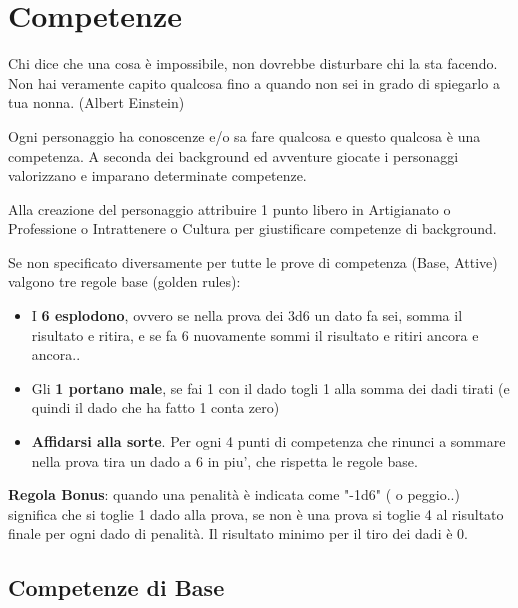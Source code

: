 \documentclass[a4paper,11pt,twoside,openany]{book}
\begin{document}

\pagebreak

\section{Competenze}

\label{competenze}
\begin{tcolorbox}[enhanced,arc=5pt,boxrule=0.3pt]{
Chi dice che una cosa è impossibile, non dovrebbe disturbare chi la sta facendo.\\
Non hai veramente capito qualcosa fino a quando non sei in grado di spiegarlo a tua nonna. (Albert Einstein)}\end{tcolorbox}\medskip


Ogni personaggio ha conoscenze e/o sa fare qualcosa e questo qualcosa è una competenza. A seconda dei background ed avventure giocate i personaggi valorizzano e imparano determinate competenze.

Alla creazione del personaggio attribuire 1 punto libero in Artigianato o Professione o Intrattenere o Cultura per giustificare competenze di background.

Se non specificato diversamente per tutte le prove di competenza (Base, Attive) valgono tre regole base  (golden rules):

\begin{itemize}
	\item
	      I \textbf{6 esplodono}, ovvero se nella prova dei 3d6 un dato fa sei, somma il risultato e ritira, e se fa 6 nuovamente sommi il risultato e ritiri ancora e ancora..
	\item
	      Gli \textbf{1 portano male}, se fai 1 con il dado togli 1 alla somma dei dadi tirati (e quindi il dado che ha fatto 1 conta zero)
	\item
	      \textbf{Affidarsi alla sorte}. Per ogni 4 punti di competenza che rinunci a sommare nella prova tira un dado a 6 in piu', che rispetta le regole base.
\end{itemize}

\textbf{Regola Bonus}: quando una penalità è indicata come "-1d6" ( o peggio..) significa che si toglie 1 dado alla prova, se non è una prova si toglie 4 al risultato finale per ogni dado di penalità. Il risultato minimo per il tiro dei dadi è 0.


\subsection{Competenze di Base}
\end{document}
